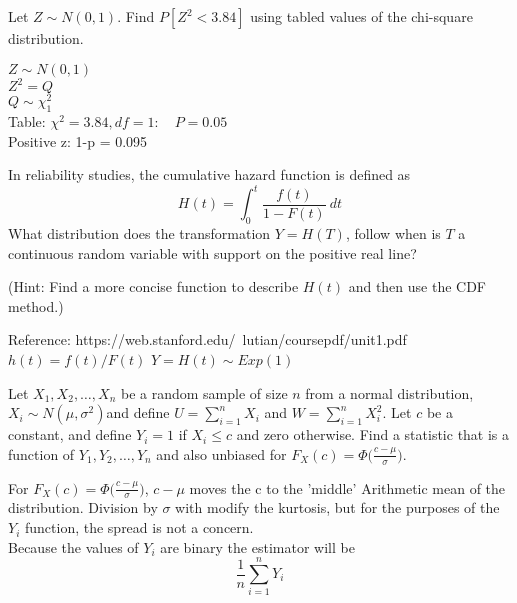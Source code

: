 \documentclass[answers]{exam}
\begin{document}
\begin{questions}
\question 
Let \(Z \sim N(0,1)\). Find \(P[Z^2<3.84]\) using tabled values of the chi-square distribution.
\begin{solution}
	\(Z \sim N(0,1)\) \\
	\(Z^2 = Q\) \\
	\(Q \sim \chi^2_1\) \\
	Table: \(\chi^2=3.84,df=1: \quad P=0.05\) \\
	Positive z: 1-p = 0.095
\end{solution}

\question 
In reliability studies, the cumulative hazard function is defined as
\[H(t)=\int_{0}^{t}\frac{f(t)}{1-F(t)} \ dt\]
What distribution does the transformation \(Y=H(T)\), 
follow when is \(T\) a continuous random variable with support on the positive real line?

(Hint: Find a more concise function to describe \(H(t)\) and then use the CDF method.)
\begin{solution}
	Reference: https://web.stanford.edu/~lutian/coursepdf/unit1.pdf \\
	\(h(t) = f(t)/F(t)\)
	$Y = H(t) \sim Exp(1)$
\end{solution}

\question 
Let \(X_1,X_2,\ldots,X_n\) be a random sample of size \(n\) from a normal distribution, 
\(X_i \sim N(\mu,\sigma^2)\)and define \(U=\sum_{i=1}^{n}X_i\) and \(W=\sum_{i=1}^{n}X_i^2\). 
Let \(c\) be a constant, and define \(Y_i=1\) if \(X_i\leq c\) and zero otherwise. 
Find a statistic that is a function of \(Y_1,Y_2,\ldots,Y_n\) and also unbiased for 
\(F_X(c)=\Phi\bigg(\frac{c-\mu}{\sigma}\bigg)\).
\begin{solution}
	For \(F_X(c) = \Phi\bigg(\frac{c-\mu}{\sigma}\bigg)\),
	\(c-\mu\) moves the c to the 'middle' Arithmetic mean of the distribution.
	Division by $\sigma$ with modify the kurtosis, but for the purposes of the $Y_i$
	function, the spread is not a concern. \\
	Because the values of \(Y_i\) are binary the estimator will be
	\[\frac{1}{n}\sum_{i=1}^{n}Y_i\]
\end{solution}


\end{questions}
\end{document}
